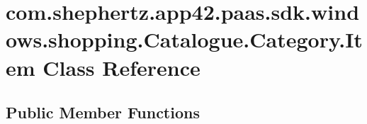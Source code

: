 \hypertarget{classcom_1_1shephertz_1_1app42_1_1paas_1_1sdk_1_1windows_1_1shopping_1_1_catalogue_1_1_category_1_1_item}{\section{com.\+shephertz.\+app42.\+paas.\+sdk.\+windows.\+shopping.\+Catalogue.\+Category.\+Item Class Reference}
\label{classcom_1_1shephertz_1_1app42_1_1paas_1_1sdk_1_1windows_1_1shopping_1_1_catalogue_1_1_category_1_1_item}
}
\subsection*{Public Member Functions}
